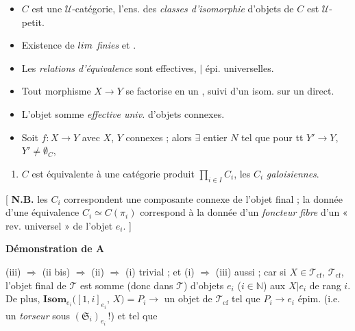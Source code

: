 \documentclass[11pt,a4paper]{article}
\begin{document}
\begin{itemize}
\item[\textbf{G0}] $C$ est une $\mathcal{U}$-catégorie, l'ens. des
 \struck{\ill{}} \emph{classes d'isomorphie} d'objets de $C$
est $\mathcal{U}$-petit.

\item[\textbf{G1}] Existence de $\varprojlim$  \emph{finies} et
\struck{$\varinjlim$} .

\item[\textbf{G2}] Les  \emph{relations d'équivalence} sont
effectives, 
 $\mid$ épi. universelles.

\item[\textbf{G3}] Tout morphisme $X \longrightarrow Y$ se factorise en un
 , suivi d'un
isom. sur un  direct.

\item[\textbf{G4}]  L'objet   
somme  \emph{effective univ.} d'objets connexes.

\item[\textbf{G5}]  Soit $f : X \longrightarrow Y$ avec $X$, $Y$ connexes ;
alors $\exists$ entier $N$ tel que pour tt $Y' \longrightarrow Y$,
$Y' \neq \emptyset_C$,  \add{\ill{}}
\end{itemize}

\begin{enumerate}
\item[(iii)] \struck{\ill{}} $C$ est équivalente à une catégorie produit
$\prod_{i \in I} C_i$, les $C_i$ \emph{galoisiennes}.
\end{enumerate}

[ \textbf{N.B.} les $C_i$ correspondent \ill{} une composante connexe
 de l'objet final ; la donnée d'une équivalence
$C_i \simeq C(\pi_i)$ correspond à la donnée d'un \emph{foncteur fibre}
 d'un « rev. universel » de l'objet $e_i$. ]


\textbf{Démonstration de A}

(iii) $\Rightarrow$ (ii bis) $\Rightarrow$ (ii) $\Rightarrow$ (i) trivial ; et
(i) $\Rightarrow$ (iii) aussi ; car si $X \in \mathcal{T}_{\mathrm{cf}}$,
\struck{\ill{}} $\mathcal{T}_{\mathrm{cf}}$,  l'objet final de
$\mathcal{T}$ est somme (donc dans $\mathcal{T}$) d'objets $e_i$
($i \in \mathbb{N}$) aux $X|e_i$ de rang $i$. De plus,
$\mathbf{Isom}_{e_i}\bigl([1, i]_{e_i} ,\, X\bigr) = P_i \longrightarrow$
 un objet de $\mathcal{T}_{\mathrm{cf}}$ tel que $P_i \longrightarrow e_i$ épim. (i.e.
un \emph{torseur} sous $(\mathfrak{S}_i)_{e_i}$\,!) et tel que
\end{document}
